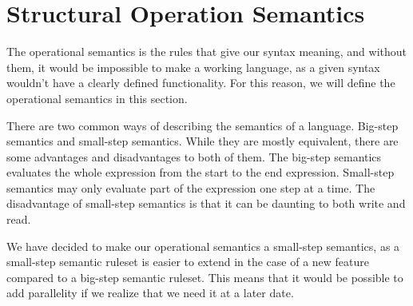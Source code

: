 \section{Structural Operation Semantics}
The operational semantics is the rules that give our syntax meaning, and without them, it would be impossible to make a working language, as a given syntax wouldn't have a clearly defined functionality. For this reason, we will define the operational semantics in this section.

There are two common ways of describing the semantics of a language. Big-step semantics and small-step semantics. While they are mostly equivalent, there are some advantages and disadvantages to both of them. The big-step semantics evaluates the whole expression from the start to the end expression. Small-step semantics may only evaluate part of the expression one step at a time. The disadvantage of small-step semantics is that it can be daunting to both write and read.

We have decided to make our operational semantics a small-step semantics, as a small-step semantic ruleset is easier to extend in the case of a new feature compared to a big-step semantic ruleset. This means that it would be possible to add parallelity if we realize that we need it at a later date.

